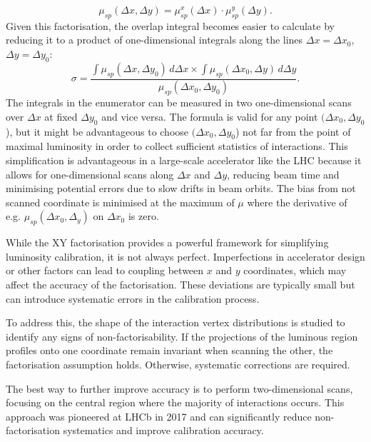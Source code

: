 \begin{equation}
\mu _{sp}(\Delta x, \Delta y) = \mu ^x_{sp}(\Delta x) \cdot \mu ^y_{sp}(\Delta y).
\end{equation}
Given this factorisation, the overlap integral becomes easier to calculate by reducing it to a product of one-dimensional integrals  along the lines $\Delta x = \Delta x_0$, $\Delta y = \Delta y_0$:
\begin{equation}
\sigma = \frac{\int \mu _{sp}(\Delta x, \Delta y_0)\, d\Delta x \times \int \mu _{sp}(\Delta x_0, \Delta y)\, d\Delta y}{\mu _{sp}(\Delta x_0, \Delta y_0)}.\label{definition_sigma_vdm}
\end{equation}
The integrals in the enumerator can be measured in two one-dimensional scans over $\Delta x$ at fixed $\Delta y_0$ and vice versa. The formula is valid for any point $(\Delta x_0, \Delta y_0$), but it might be advantageous to choose $(\Delta x_0, \Delta y_0$) not far from the point of maximal luminosity in order to collect sufficient statistics of interactions. This simplification is advantageous in a large-scale accelerator like the LHC because it allows for one-dimensional scans along $\Delta x$ and $\Delta y$, reducing beam time and minimising potential errors due to slow drifts in beam orbits. The bias from not scanned coordinate is minimised at the maximum of $\mu$ where the derivative of e.g. $\mu_{sp}(\Delta x_0, \Delta_y)$ on $\Delta x_0$ is zero.

While the XY factorisation provides a powerful framework for simplifying luminosity calibration, it is not always perfect. Imperfections in accelerator design or other factors can lead to coupling between $x$ and $y$ coordinates, which may affect the accuracy of the factorisation. These deviations are typically small but can introduce systematic errors in the calibration process.

To address this, the shape of the interaction vertex distributions is studied to identify any signs of non-factorisability. If the projections of the luminous region profiles onto one coordinate remain invariant when scanning the other, the factorisation assumption holds. Otherwise, systematic corrections are required.

The best way to further improve accuracy is to perform two-dimensional scans, focusing on the central region where the majority of interactions occurs. This approach was pioneered at LHCb in 2017 and can significantly reduce non-factorisation systematics and improve calibration accuracy\cite{Balagura_2021}.

